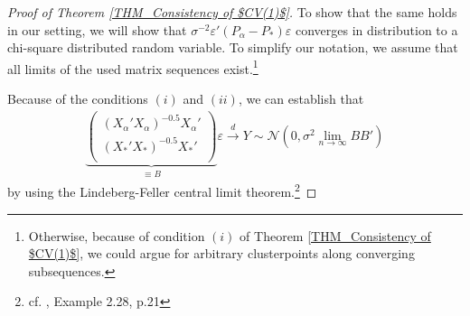 \documentclass[Research_Module_ES.tex]{subfiles}
\begin{document}
\begin{proof}[Proof of Theorem \ref{THM_Consistency of $CV(1)$}]
To show that the same holds in our setting, we will show that $\sigma^{-2}\varepsilon'(P_\alpha-P_\ast)\varepsilon$ converges in distribution to a chi-square distributed random variable. To simplify our notation, we assume that all limits of the used matrix sequences exist.\footnote{Otherwise, because of condition $(i)$ of Theorem \ref{THM_Consistency of $CV(1)$}, we could argue for arbitrary clusterpoints along converging subsequences.}

Because of the conditions $(i)$ and $(ii)$, we can establish that
\begin{align*}
\underbrace{\left(
\begin{array}{c}
(X_\alpha'X_\alpha)^{-0.5} X_\alpha'\\
(X_\ast'X_\ast)^{-0.5}X_\ast'\\
\end{array}
\right)}_{\equiv B}
\varepsilon \overset{d}{\longrightarrow} Y \sim \mathcal{N}\left(0,\sigma^2 \lim_{n\to\infty}BB'\right)
\end{align*}
by using the Lindeberg-Feller central limit theorem.\footnote{cf. \cite{vandervaart}, Example 2.28, p.21}


\end{proof}
\end{document}
